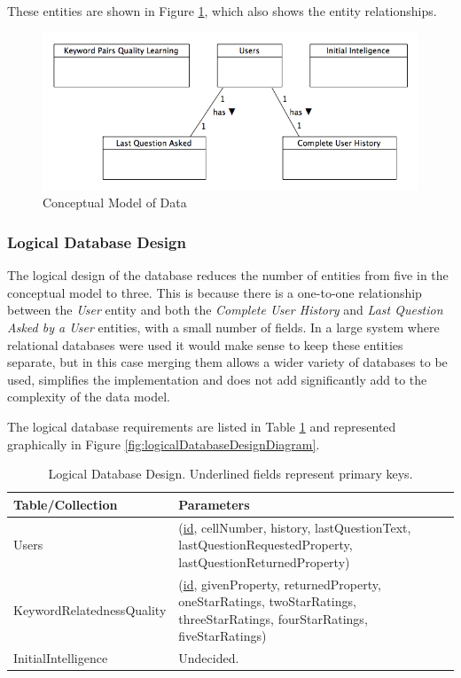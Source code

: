 \documentclass[authoryearcitations]{UoYCSproject}
\begin{document}
These entities are shown in Figure \ref{fig:conceptualDatabaseDesignDiagram}, which also shows the entity relationships.

\begin{figure}[htb] 
\includegraphics[width=\linewidth]{conceptualModel}
\caption{Conceptual Model of Data}
\label{fig:conceptualDatabaseDesignDiagram}
\end{figure}

\subsubsection{Logical Database Design}
The logical design of the database reduces the number of entities from five in the conceptual model to three.  This is because there is a one-to-one relationship between the \textit{User} entity and both the \textit{Complete User History} and \textit{Last Question Asked by a User} entities, with a small number of fields.  In a large system where relational databases were used it would make sense to keep these entities separate, but in this case merging them allows a wider variety of databases to be used, simplifies the implementation and does not add significantly add to the complexity of the data model. %

The logical database requirements are listed in Table \ref{table:logicalDatabaseDesignListing} and represented graphically in Figure \ref{fig:logicalDatabaseDesignDiagram}.

\begin{table}
\begin{center}
    \begin{tabular}{| l | p{6cm} |}
    \hline
    Table/Collection & Parameters \\ \hline
    Users & (\underline{id}, cellNumber, history, lastQuestionText, lastQuestionRequestedProperty, lastQuestionReturnedProperty) \\ \hline
    KeywordRelatednessQuality & (\underline{id}, givenProperty, returnedProperty, oneStarRatings, twoStarRatings, threeStarRatings, fourStarRatings, fiveStarRatings) \\ \hline
    InitialIntelligence & \color{red} Undecided. \\ \hline
    \end{tabular}
    \caption{Logical Database Design.  Underlined fields represent primary keys.}
    \label{table:logicalDatabaseDesignListing}
\end{center}
\end{table}
\end{document}
